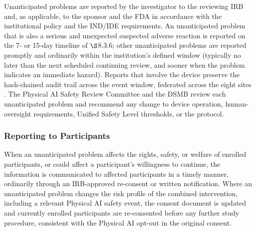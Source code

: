 Unanticipated problems are reported by the investigator to the reviewing IRB and, as
applicable, to the sponsor and the FDA in accordance with the institutional policy
and the IND/IDE requirements. An unanticipated problem that is also a serious and
unexpected suspected adverse reaction is reported on the 7- or 15-day timeline of
$\S$8.3.6; other unanticipated problems are reported promptly and ordinarily within
the institution's defined window (typically no later than the next scheduled
continuing review, and sooner when the problem indicates an immediate hazard).
Reports that involve the device preserve the hash-chained audit trail across the
event window, federated across the eight sites \cite{ecfr2026part11}. The Physical AI
Safety Review Committee and the DSMB review each unanticipated problem and recommend
any change to device operation, human-oversight requirements, Unified Safety Level
thresholds, or the protocol.

\subsubsection{Reporting to Participants}

When an unanticipated problem affects the rights, safety, or welfare of enrolled
participants, or could affect a participant's willingness to continue, the
information is communicated to affected participants in a timely manner, ordinarily
through an IRB-approved re-consent or written notification. Where an unanticipated
problem changes the risk profile of the combined intervention, including a relevant
Physical AI safety event, the consent document is updated and currently enrolled
participants are re-consented before any further study procedure, consistent with the
Physical AI opt-out in the original consent.

